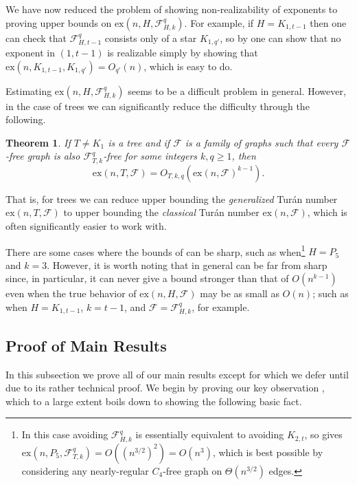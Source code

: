 \documentclass[12pt,letterpaper]{article}
\newtheorem{theorem}{Theorem}[section]
\theoremstyle{definition}
\newcommand{\pow}{q} %
\newcommand{\ex}{\mathrm{ex}}
\renewcommand{\c}[1]{\mathcal{#1}}
\begin{document}
	We have now reduced the problem of showing non-realizability of exponents to proving upper bounds on $\ex(n,H,\c{F}_{H,k}^\pow)$.   For example, if $H=K_{1,t-1}$ then one can check that $\c{F}_{H,t-1}^\pow$ consists only of a star $K_{1,q'}$, so by  one can show that no exponent in $(1,t-1)$ is realizable simply by showing that $\ex(n,K_{1,t-1},K_{1,\pow'})=O_{\pow'}(n)$, which is easy to do.
	
	Estimating $\ex(n,H,\c{F}_{H,k}^\pow)$ seems to be a difficult problem in general.  However, in the case of trees we can significantly reduce the difficulty through the following.
	
	\begin{theorem}\label{theorem:treeReduction}
		If $T\ne K_1$ is a tree and if $\c{F}$ is a family of graphs such that every $\c{F}$-free graph is also $\c{F}_{T,k}^q$-free for some integers $k,\pow\ge 1$, then
		\[
		\ex(n,T,\c{F})=O_{T,k,q}(\ex(n,\c{F})^{k-1}).
		\]
	\end{theorem}
	That is, for trees we can reduce upper bounding the \textit{generalized} Tur\'an number $\ex(n,T,\c{F})$ to upper bounding the \textit{classical} Tur\'an number $\ex(n,\c{F})$, which is often significantly easier to work with.
	
	There are some cases where the bounds of  can be sharp, such as when\footnote{In this case avoiding $\c{F}_{H,k}^\pow$ is essentially equivalent to avoiding $K_{2,t}$, so  gives $\ex(n,P_5,\c{F}_{T,k}^\pow)=O((n^{3/2})^2)=O(n^3)$, which is best possible by considering any nearly-regular $C_4$-free graph on $\Theta(n^{3/2})$ edges.} $H=P_5$ and $k=3$.  However, it is worth noting that in general  can be far from sharp since, in particular, it can never give a bound stronger than that of $O(n^{k-1})$ even when the true behavior of $\ex(n,H,\c{F})$ may be as small as $O(n)$; such as when $H=K_{1,t-1}$, $k=t-1$, and $\c{F}=\c{F}_{H,k}^\pow$, for example.
	
	\subsection{Proof of Main Results}\label{subsection non-realizable main}
	In this subsection we prove all of our main results except for  which we defer until  due to its rather technical proof.  We begin by proving our key observation , which to a large extent boils down to showing the following basic fact.
	
\end{document}
